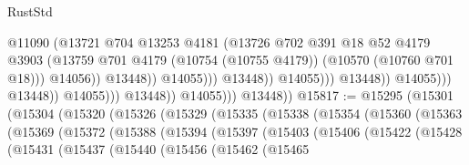 \begin{lexlean}{RustStd}
\begin{coremodule}
                                                          @11090
                                                          (@13721
                                                            @704
                                                            @13253
                                                            @4181
                                                            (@13726
                                                              @702
                                                              @391
                                                              @18
                                                              @52
                                                              @4179
                                                              @3903
                                                              (@13759
                                                                @701
                                                                @4179
                                                                (@10754 (@10755 @4179))
                                                                (@10570 (@10760 @701 @18)))
                                                              @14056))
                                                          @13448))
                                                      @14055)))
                                                @13448))
                                            @14055)))
                                      @13448))
                                  @14055)))
                            @13448))
                        @14055)))
                  @13448))
              @14055)))
        @13448))
@15817 := @15295
    (@15301
      (@15304
        (@15320
          (@15326
            (@15329
              (@15335
                (@15338
                  (@15354
                    (@15360
                      (@15363
                        (@15369
                          (@15372
                            (@15388
                              (@15394
                                (@15397
                                  (@15403
                                    (@15406
                                      (@15422
                                        (@15428
                                          (@15431
                                            (@15437
                                              (@15440
                                                (@15456
                                                  (@15462
                                                    (@15465

\end{coremodule}
\end{lexlean}
